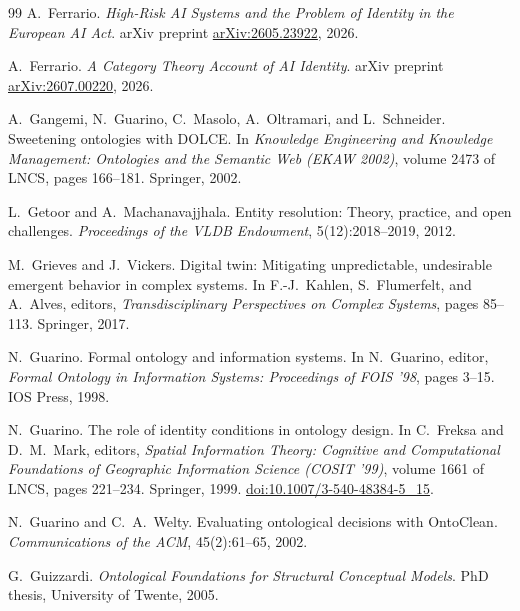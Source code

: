 \documentclass[11pt]{article}
\theoremstyle{plain}
\theoremstyle{definition}
\theoremstyle{remark}
\begin{document}
\begin{thebibliography}{99}
  A.\ Ferrario.
  \emph{High-Risk AI Systems and the Problem of Identity in the European AI Act}.
  arXiv preprint \href{https://arxiv.org/abs/2605.23922}{arXiv:2605.23922}, 2026.

  A.\ Ferrario.
  \emph{A Category Theory Account of AI Identity}.
  arXiv preprint \href{https://arxiv.org/abs/2607.00220}{arXiv:2607.00220}, 2026.

  A.\ Gangemi, N.\ Guarino, C.\ Masolo, A.\ Oltramari, and L.\ Schneider.
  Sweetening ontologies with DOLCE.
  In \emph{Knowledge Engineering and Knowledge Management: Ontologies and the Semantic Web (EKAW 2002)},
  volume 2473 of LNCS, pages 166--181. Springer, 2002.

  L.\ Getoor and A.\ Machanavajjhala.
  Entity resolution: Theory, practice, and open challenges.
  \emph{Proceedings of the VLDB Endowment}, 5(12):2018--2019, 2012.

  M.\ Grieves and J.\ Vickers.
  Digital twin: Mitigating unpredictable, undesirable emergent behavior in complex systems.
  In F.-J.\ Kahlen, S.\ Flumerfelt, and A.\ Alves, editors, \emph{Transdisciplinary Perspectives on Complex Systems}, pages 85--113. Springer, 2017.

  N.\ Guarino.
  Formal ontology and information systems.
  In N.\ Guarino, editor, \emph{Formal Ontology in Information Systems: Proceedings of FOIS '98}, pages 3--15. IOS Press, 1998.

  N.\ Guarino.
  The role of identity conditions in ontology design.
  In C.\ Freksa and D.\ M.\ Mark, editors, \emph{Spatial Information Theory: Cognitive and Computational Foundations of Geographic Information Science (COSIT '99)}, volume 1661 of LNCS, pages 221--234. Springer, 1999.
  \href{https://doi.org/10.1007/3-540-48384-5_15}{doi:10.1007/3-540-48384-5\_15}.

  N.\ Guarino and C.\ A.\ Welty.
  Evaluating ontological decisions with OntoClean.
  \emph{Communications of the ACM}, 45(2):61--65, 2002.

  G.\ Guizzardi.
  \emph{Ontological Foundations for Structural Conceptual Models}.
  PhD thesis, University of Twente, 2005.


\end{thebibliography}
\end{document}
